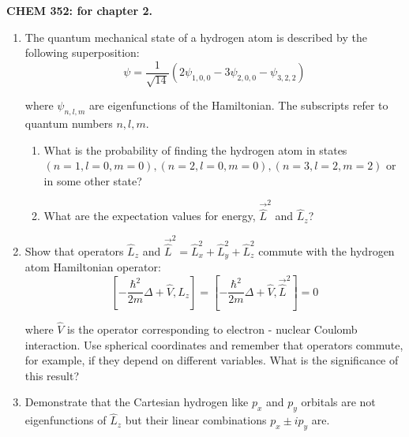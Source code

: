 \noindent
\textbf{CHEM 352:
 for chapter 2.}\\

\begin{enumerate}


\item The quantum mechanical state of a hydrogen atom is described by the following superposition:
$$\psi = \frac{1}{\sqrt{14}}\left(2\psi_{1,0,0} - 3\psi_{2,0,0} - \psi_{3,2,2}\right)$$

where $\psi_{n,l,m}$ are eigenfunctions of the Hamiltonian. The subscripts refer to quantum numbers $n,l,m$.

\begin{enumerate}
\item What is the probability of finding the hydrogen atom in states $(n = 1, l = 0, m = 0), (n = 2, l = 0, m = 0), (n = 3, l = 2, m = 2)$ or in some other state?
\item What are the expectation values for energy, $\vec{\hat{L}}^2$ and $\hat{L}_z$?
\end{enumerate}



\item Show that operators $\hat{L}_z$ and $\vec{\hat{L}}^2 = \hat{L}_x^2 + \hat{L}_y^2 + \hat{L}_z^2$ commute with the hydrogen atom Hamiltonian operator:
$$\left[-\frac{\hbar^2}{2m}\Delta + \hat{V}, \hat{L}_z\right] = \left[-\frac{\hbar^2}{2m}\Delta + \hat{V}, \vec{\hat{L}}^2\right] = 0$$

where $\hat{V}$ is the operator corresponding to electron - nuclear Coulomb interaction. Use spherical coordinates and remember that operators commute, for example, if they depend on different variables. What is the significance of this result?



\item Demonstrate that the Cartesian hydrogen like $p_x$ and $p_y$ orbitals are not eigenfunctions of $\hat{L}_z$ but their linear combinations $p_x \pm ip_y$ are.




\end{enumerate}
